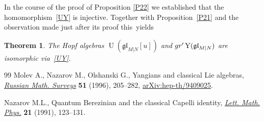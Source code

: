 \documentclass[11pt]{article}
\numberwithin{equation}{section}
\newtheorem{Theorem}{Theorem}[section]
\def\g{\glMN [u]}
\def\glMN{\mathfrak{gl}_{M|N}}
\def\grpr{{\rm gr}^{\prime} }
\def\Ug{\operatorname{U}(\g)}
\def\YMN{\operatorname{Y}(\glMN)}
\begin{document}
In the course of the proof of Proposition \ref{P22} we established that
the homomorphism~\eqref{UY} is injective.
Together with Proposition~\ref{P21}
and the observation made just after its proof this~yields

\begin{Theorem}\label{T18}The Hopf algebras $\Ug$ and $\grpr\YMN$ are isomorphic via~\eqref{UY}.
\end{Theorem}
\begin{thebibliography}{99}
Molev A., Nazarov M., Olshanski G., Yangians and classical {L}ie algebras,
 \href{https://doi.org/10.1070/RM1996v051n02ABEH002772}{\textit{Russian Math. Surveys}} \textbf{51} (1996), 205--282,
 \href{https://arxiv.org/abs/hep-th/9409025}{arXiv:hep-th/9409025}.

Nazarov M.L., Quantum {B}erezinian and the classical {C}apelli identity,
 \href{https://doi.org/10.1007/BF00401646}{\textit{Lett. Math. Phys.}} \textbf{21} (1991), 123--131.

\end{thebibliography}
\end{document}
